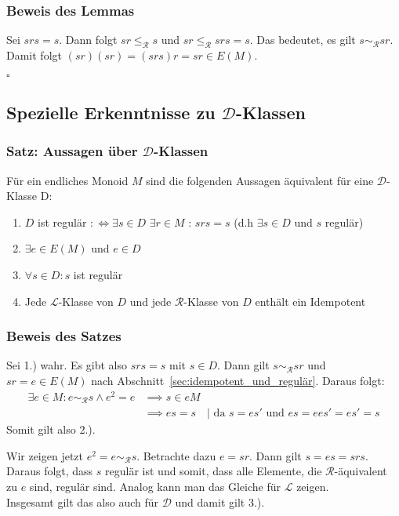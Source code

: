 \documentclass[12pt, german]{article}
\newcommand{\grer}{\sim_{\mathcal{R}}}
\newcommand{\lgrereq}{\leqslant_{\mathcal{R}}}
\newcommand{\lcal}{\mathcal L}
\newcommand{\rcal}{\mathcal R}
\newcommand{\dcal}{\mathcal D}
\newcommand{\bewiesen}{
	
	\begin{flushright}
		$\square$  \\
\end{flushright}}
\begin{document}
	\subsubsection{Beweis des Lemmas}
	Sei $srs=s$. Dann folgt $sr \lgrereq s$ und $sr \lgrereq srs = s$. Das bedeutet, es gilt $s \grer sr$. Damit folgt $(sr)(sr) = (srs)r = sr \in E(M)$.
	\bewiesen
	
	\subsection{Spezielle Erkenntnisse zu $\dcal$-Klassen}
	\subsubsection{Satz: Aussagen über $\dcal$-Klassen}
	Für ein endliches Monoid $M$ sind die folgenden Aussagen äquivalent für eine $\dcal$-Klasse D: 
	\begin{enumerate}[label=\arabic*.)]
		\item $D$ ist regulär $:\iff \exists s \in D$  $\exists r \in M$ : $srs = s$ (d.h $\exists s \in D$ und $s$ regulär)
		\item $\exists e \in E(M)$ und $e \in D$
		\item $\forall s \in D: s$ ist regulär
		\item Jede $\lcal$-Klasse von $D$ und jede $\rcal$-Klasse von $D$ enthält ein Idempotent
	\end{enumerate}
	
	\subsubsection{Beweis des Satzes}
	Sei 1.) wahr. Es gibt also $srs = s$ mit $s \in D$. Dann gilt $s \grer sr$ und $sr=e \in E(M)$ nach Abschnitt~\ref{sec:idempotent_und_regulär}. Daraus folgt: 
	\begin{align*}
		 \exists e \in M: e \grer s \wedge e^2 = e 
		&\implies s \in eM \\
		&\implies es = s \quad | \text{ da } s=es' \text{ und } es = ees' = es' = s
	\end{align*}
	Somit gilt also 2.).
	\newline
	
	Wir zeigen jetzt $e^2 = e \grer s$. Betrachte dazu $e=sr$. Dann gilt $ s = es = srs$. Daraus folgt, dass $s$ regulär ist und somit, dass alle Elemente, die $\rcal$-äquivalent zu $e$ sind, regulär sind.
	Analog kann man das Gleiche für $\lcal$ zeigen. \\
	Insgesamt gilt das also auch für $\dcal$ und damit gilt 3.).
	\newline
	
\end{document}
